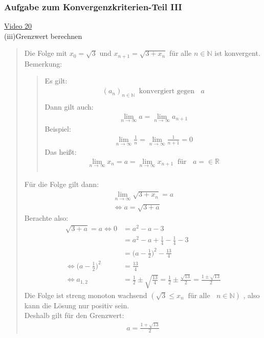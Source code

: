 \subsubsection{Aufgabe zum Konvergenzkriterien-Teil III}
\href{https://youtu.be/4zIPa5nNbdU}{Video 20}\\
(iii)\;\;Grenzwert berechnen\\
\begin{quote}
	Die Folge mit $ x_0=\sqrt{3} $ und $ x_{n+1}=\sqrt{3+x_n} $ für alle $ n\in\mathbb{N} $ ist konvergent.\vspace*{4mm}\\
	Bemerkung:\\
	\begin{quote}
		Es gilt:\\
		\begin{align*}
		(a_n)_{n\in\mathbb{N}}\;\;\text{konvergiert gegen } \;\;a\\
		\end{align*}
		Dann gilt auch:\\
		\begin{align*}
		\lim\limits_ {n\to\infty}a=\lim\limits_ {n\to\infty}a_{n+1}
		\end{align*}
		Beispiel:\\
		\begin{align*}
		\lim\limits_ {n\to\infty}\frac{1}{n}=\lim\limits_ {n\to\infty}\frac{1}{n+1}=0
		\end{align*}
		Das heißt:\\
		\begin{align*}
		\lim\limits_ {n\to\infty}x_n=a=	\lim\limits_ {n\to\infty}x_{n+1}\;\;\text{für } \;\;a=\in\mathbb{R}\\
		\end{align*}
	\end{quote} 
	Für die Folge gilt dann:\\
	\begin{align*}
	\lim\limits_ {n\to\infty}\sqrt{3+x_n}=a\\
	\Leftrightarrow a=\sqrt{3+a}
	\end{align*}
	Berachte also:\\
	\begin{align*}
	\sqrt{3+a}=a\Leftrightarrow 0&=a^2-a-3\\
	&=a^2-a+\frac{1}{4}-\frac{1}{4}-3\\
	&=\bigg(a-\frac{1}{2}\bigg)^2-\frac{13}{4}\\
	\Leftrightarrow \bigg(a-\frac{1}{2}\bigg)^2&=\frac{13}{4}\\
	\Leftrightarrow a_{1,2}&=\frac{1}{2}\pm \sqrt{\frac{13}{4}}=\frac{1}{2}\pm \frac{\sqrt{13}}{2}=\frac{1\pm\sqrt{13}}{2}
	\end{align*}
	Die Folge ist streng monoton wachsend $ (\sqrt{3}\leq x_n\;\;\text{für alle }\;\;n\in\mathbb{N}) $ , also kann die Lösung nur positiv sein.\\
	Deshalb gilt für den Grenzwert:\\
	\begin{align*}
	a=\frac{1+\sqrt{13}}{2}
	\end{align*}
	
\end{quote}


